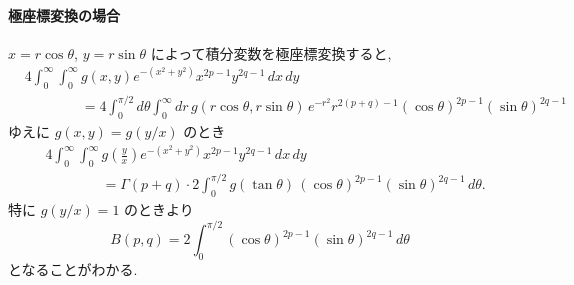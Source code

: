 \documentclass[12pt,twoside]{jarticle}
\theoremstyle{jplain}
\theoremstyle{jplain}
\theoremstyle{jplain}
\numberwithin{theorem}{section}
\numberwithin{equation}{section}
\numberwithin{figure}{section}
\numberwithin{table}{section}
\begin{document}
\paragraph{極座標変換の場合}
$x=r\cos\theta$, $y=r\sin\theta$ によって積分変数を極座標変換すると,
\begin{align*}
&
4\int_0^\infty\int_0^\infty g(x,y)e^{-(x^2+y^2)}x^{2p-1}y^{2q-1}\,dx\,dy
\\ & \qquad\qquad
=
4\int_0^{\pi/2}d\theta\int_0^\infty dr\,
g(r\cos\theta,r\sin\theta)\,e^{-r^2}r^{2(p+q)-1} (\cos\theta)^{2p-1}(\sin\theta)^{2q-1}
\end{align*}
ゆえに $g(x,y)=g(y/x)$ のとき
\begin{align*}
&
4\int_0^\infty\int_0^\infty g\left(\frac{y}{x}\right)e^{-(x^2+y^2)}x^{2p-1}y^{2q-1}\,dx\,dy
\\ & \qquad\qquad
=
\Gamma(p+q)\cdot
2\int_0^{\pi/2} g(\tan\theta)\,(\cos\theta)^{2p-1}(\sin\theta)^{2q-1}\,d\theta.
\end{align*}
特に $g(y/x)=1$ のときより
\[
B(p,q) = 2\int_0^{\pi/2} (\cos\theta)^{2p-1}(\sin\theta)^{2q-1}\,d\theta
\]
となることがわかる.
\end{document}
